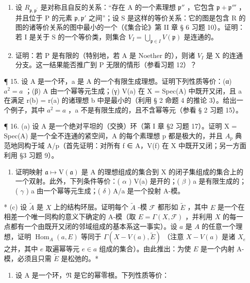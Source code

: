 \begin{enumerate}
\def\labelenumi{(\alph{enumi})}
\item
  设 \(R_{\mathfrak{p},\mathfrak{p}^{\prime}}\) 是对称且自反的关系：“存在 A 的一个素理想 \(\mathfrak{p}''\) ，它包含 \(\mathfrak{p} + \mathfrak{p}'''\) ，并且位于 P 的元素 \(\mathfrak{p},\mathfrak{p}'\) 之间”；设 S 是这样的等价关系：它的图是包含 R 的图的诸等价关系的图中最小的一个（《集合论》第 II 章 § 6 习题 10）。证明：若 I 是关于 S 的一个等价类，则集合 \(V_{I} = \bigcup_{\mathfrak{p}\in I}V(\mathfrak{p})\) 是连通的。
\item
  证明：若 P 是有限的（特别地，若 A 是 Noether 的），则诸 \(V_{I}\) 是 X 的连通分支。这一结果能否推广到 P 无限的情形（参看习题 12）？
\end{enumerate}

¶ 15. 设 A 是一个环，a 是 A 的一个有限生成理想。证明下列性质等价：(α) \(a^{2} = a\) ；(β) A 由一个幂等元生成；(γ) V(a) 在 X = Spec(A) 中既开又闭，且 a 在满足 r(b) = r(a) 的诸理想 b 中是最小的（利用 § 2 命题 4 的推论 3）。给出一个例子，其中 \(a^{2} = a\) ，a 不是有限生成的，且不含幂等元（参看 § 2 习题 15）。

¶ 16. (a) 设 A 是一个绝对平坦的（交换）环（第 I 章 §2 习题 17）。证明 X = Spec(A) 是一个全不连通的紧空间，A 的每个素理想 p 都是极大的，并且 \(A_{p}\) 典范地同构于域 A/p（首先证明：对所有 f ∈ A，V(f) 在 X 中既开又闭；另一方面利用 §3 习题 9）。

\begin{enumerate}
\def\labelenumi{(\alph{enumi})}
\setcounter{enumi}{1}
\tightlist
\item
  证明映射 \(\mathfrak{a}\mapsto\mathrm{V}(\mathfrak{a})\) 是 A 的理想组成的集合到 X 的闭子集组成的集合上的一个双射。此外，下列条件等价：( \(\alpha\) ) V(a) 是开的；( \(\beta\) ) a 是有限生成的；( \(\gamma\) ) a 由一个幂等元生成；( \(\delta\) ) A/a 是一个投射 A-模。
\end{enumerate}

* (c) 设 \(\tilde{A}\) 是 \(X\) 上的结构环层。证明每个 \(\tilde{A}\) -模 \(\mathcal{F}\) 都形如 \(\tilde{E}\) ，其中 \(E\) 是一个在相差一个唯一同构的意义下确定的 A-模（取 \(E = \Gamma(X, \mathcal{F})\) ，并利用 \(X\) 的每一点都有一个由既开又闭的邻域组成的基本系这一事实）。设 \(a\) 是 \(A\) 的任意一个理想，证明 \(\operatorname{Hom}_A(a, E)\) 等同于 \(\Gamma(X - V(a), \tilde{E})\) （注意 \(X - V(a)\) 是诸 \(X_e\) 之并，其中 \(e\) 取遍幂等元 \(e \in a\) 组成的集合）。由此推出：为使 \(E\) 是一个内射 A-模，必须且只需 \(\tilde{E}\) 是松弛的。*

\begin{enumerate}
\def\labelenumi{(\alph{enumi})}
\setcounter{enumi}{3}
\tightlist
\item
  设 A 是一个环，\(\mathfrak{N}\) 是它的幂零根。下列性质等价：
\end{enumerate}


